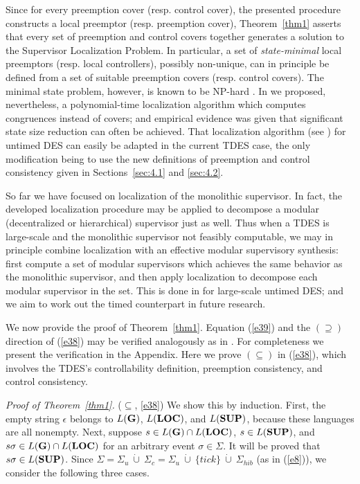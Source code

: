 \documentclass[twocolumn]{autart}
\begin{document}
{ Since for every preemption cover (resp. control cover),
the presented procedure constructs a local preemptor (resp.
preemption cover),} Theorem~\ref{thm1} asserts that every set of
preemption and control covers together generates a solution to the
Supervisor Localization Problem. In particular, a set of {\it
state-minimal} local preemptors (resp. local controllers), possibly
non-unique, can in principle be defined from a set of suitable
preemption covers (resp. control covers). The minimal state problem,
however, is known to be NP-hard \cite{SuWonham:2004}. In
\cite{CaiWonham:2010a} we proposed, nevertheless, a polynomial-time
localization algorithm which computes congruences instead of covers;
and empirical evidence was given that significant state size
reduction can often be achieved. That localization algorithm (see
\cite[Section~III-B]{CaiWonham:2010a}) for untimed DES can easily be
adapted in the current TDES case, the only modification being to use
the new definitions of preemption and control consistency given in
Sections~\ref{sec:4.1} and \ref{sec:4.2}.

So far we have focused on localization of the
monolithic supervisor. In fact, the developed localization procedure
may be applied to decompose a modular (decentralized or
hierarchical) supervisor just as well.  Thus when a TDES is
large-scale and the monolithic supervisor not feasibly computable,
we may in principle combine localization with an effective modular
supervisory synthesis: first compute a set of modular supervisors
which achieves the same behavior as the monolithic supervisor, and
then apply localization to decompose each modular supervisor in the
set. This is done in \cite{CaiWonham:2010a,CaiWonham:2010b} for
large-scale untimed DES; and we aim to work out the timed
counterpart in future research.



We now provide the proof of Theorem~\ref{thm1}. Equation (\ref{e39})
and the $(\supseteq)$ direction of (\ref{e38}) may be verified
analogously as in \cite{CaiWonham:2010a}. For completeness we
present the verification in the Appendix. Here we prove
$(\subseteq)$ in (\ref{e38}), which involves the TDES's
controllability definition, preemption consistency, and control
consistency.

\emph{Proof of Theorem~\ref{thm1}.} ($\subseteq$, \ref{e38}) We show
this by induction. First, the empty string $\epsilon$ belongs to
$L({\bf G})$, $L({\bf LOC})$, and $L({\bf SUP})$, because these
languages are all nonempty.  Next, suppose $s \in L({\bf G}) \cap
L({\bf LOC})$, $s \in L({\bf SUP})$, and $s\sigma \in L({\bf G})
\cap L({\bf LOC})$ for an arbitrary event $\sigma \in \Sigma$. It
will be proved that $s\sigma \in L({\bf SUP})$. Since $\Sigma =
\Sigma_u \ \dot\cup\ \Sigma_c = \Sigma_u \ \dot\cup\ \{tick\} \
\dot\cup\ \Sigma_{hib}$ (as in (\ref{e8})), we consider the
following three cases.
\end{document}
